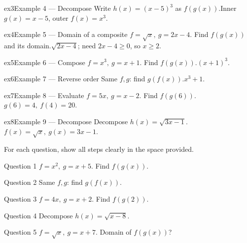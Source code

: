 \documentclass[11pt]{article}
\begin{document}
\begin{example}{ex3}{Example 4 --- Decompose}
Write $h(x)=(x-5)^3$ as $f(g(x))$.\soln Inner $g(x)=x-5$, outer $f(x)=x^3$.
\end{example}

\begin{example}{ex4}{Example 5 --- Domain of a composite}
$f=\sqrt x,\ g=2x-4$. Find $f(g(x))$ and its domain.\soln $\sqrt{2x-4}$; need $2x-4\ge0$, so $x\ge2$.
\end{example}

\begin{example}{ex5}{Example 6 --- Compose}
$f=x^3,\ g=x+1$. Find $f(g(x))$.\soln $(x+1)^3$.
\end{example}

\begin{example}{ex6}{Example 7 --- Reverse order}
Same $f,g$: find $g(f(x))$.\soln $x^3+1$.
\end{example}

\begin{example}{ex7}{Example 8 --- Evaluate}
$f=5x,\ g=x-2$. Find $f(g(6))$.\soln $g(6)=4,\ f(4)=20$.
\end{example}

\begin{example}{ex8}{Example 9 --- Decompose}
Decompose $h(x)=\sqrt{3x-1}$.\soln $f(x)=\sqrt x,\ g(x)=3x-1$.
\end{example}

\clearpage
{}
For each question, show all steps clearly in the space provided.

\begin{qbox}{Question 1}
$f=x^2,\ g=x+5$. Find $f(g(x))$.\workspace{2.4cm}
\end{qbox}

\begin{qbox}{Question 2}
Same $f,g$: find $g(f(x))$.\workspace{2.4cm}
\end{qbox}

\begin{qbox}{Question 3}
$f=4x,\ g=x+2$. Find $f(g(2))$.\workspace{2.4cm}
\end{qbox}

\begin{qbox}{Question 4}
Decompose $h(x)=\sqrt{x-8}$.\workspace{2.4cm}
\end{qbox}

\begin{qbox}{Question 5}
$f=\sqrt x,\ g=x+7$. Domain of $f(g(x))$?\workspace{2.4cm}
\end{qbox}
\end{document}

